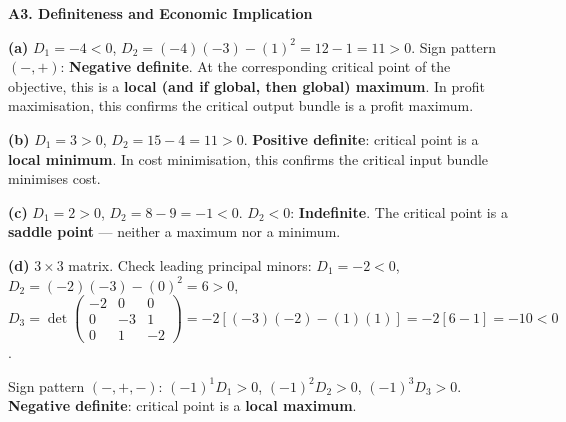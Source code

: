 \documentclass[12pt, a4paper]{article}
\theoremstyle{definition}
\begin{document}
\begin{solbox}
\textbf{A3. Definiteness and Economic Implication}

\textbf{(a)} $D_1=-4<0$, $D_2=(-4)(-3)-(1)^2=12-1=11>0$.
Sign pattern $(-,+)$: \textbf{Negative definite}.
At the corresponding critical point of the objective, this is a
\textbf{local (and if global, then global) maximum}. In profit maximisation,
this confirms the critical output bundle is a profit maximum.

\textbf{(b)} $D_1=3>0$, $D_2=15-4=11>0$.
\textbf{Positive definite}: critical point is a \textbf{local minimum}.
In cost minimisation, this confirms the critical input bundle minimises cost.

\textbf{(c)} $D_1=2>0$, $D_2=8-9=-1<0$.
$D_2<0$: \textbf{Indefinite}. The critical point is a \textbf{saddle point} ---
neither a maximum nor a minimum.

\textbf{(d)} $3\times3$ matrix. Check leading principal minors:
$D_1=-2<0$,
$D_2=(-2)(-3)-(0)^2=6>0$,
$D_3 = \det\begin{pmatrix}-2&0&0\\0&-3&1\\0&1&-2\end{pmatrix}
= -2[(-3)(-2)-(1)(1)] = -2[6-1]=-10<0$.

Sign pattern $(-,+,-)$: $(-1)^1D_1>0$, $(-1)^2D_2>0$, $(-1)^3D_3>0$.
\textbf{Negative definite}: critical point is a \textbf{local maximum}.
\end{solbox}
\end{document}
